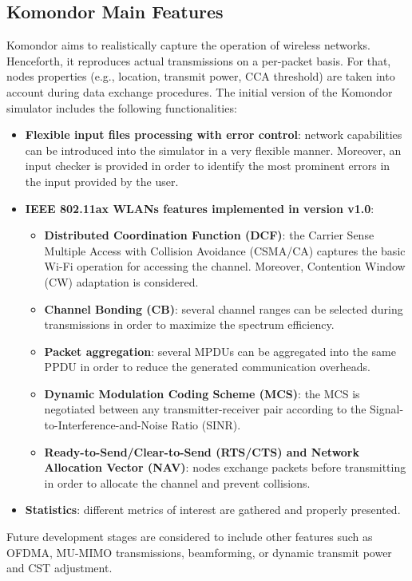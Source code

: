 \documentclass[a4paper]{article}
\begin{document}
	\subsection{Komondor Main Features}
	\label{section:features}
	Komondor aims to realistically capture the operation of wireless networks. Henceforth, it reproduces actual transmissions on a per-packet basis. For that, nodes properties (e.g., location, transmit power, CCA threshold) are taken into account during data exchange procedures. The initial version of the Komondor simulator includes the following functionalities:
	\begin{itemize}
		\item \textbf{Flexible input files processing with error control}: network capabilities can be introduced into the simulator in a very flexible manner. Moreover, an input checker is provided in order to identify the most prominent errors in the input provided by the user.
		\item \textbf{IEEE 802.11ax WLANs features implemented in version v1.0}:
		\begin{itemize}
			\item \textbf{Distributed Coordination Function (DCF)}: the Carrier Sense Multiple Access with Collision Avoidance (CSMA/CA) captures the basic Wi-Fi operation for accessing the channel. Moreover, Contention Window (CW) adaptation is considered.
			\item \textbf{Channel Bonding (CB)}: several channel ranges can be selected during transmissions in order to maximize the spectrum efficiency.
			\item \textbf{Packet aggregation}: several MPDUs can be aggregated into the same PPDU in order to reduce the generated communication overheads.
			\item\textbf{ Dynamic Modulation Coding Scheme (MCS)}: the MCS is negotiated between any transmitter-receiver pair according to the Signal-to-Interference-and-Noise Ratio (SINR).
			\item \textbf{Ready-to-Send/Clear-to-Send (RTS/CTS) and Network Allocation Vector (NAV)}: nodes exchange packets before transmitting in order to allocate the channel and prevent collisions.
		\end{itemize}
		\item \textbf{Statistics}: different metrics of interest are gathered and properly presented.
	\end{itemize}

	Future development stages are considered to include other features such as OFDMA, MU-MIMO transmissions, beamforming, or dynamic transmit power and CST adjustment.
	
\end{document}
